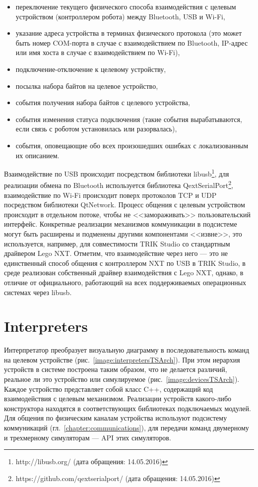 \documentclass[conference]{IEEEtran}
\begin{document}
\begin{itemize}
    \item переключение текущего физического способа взаимодействия с целевым устройством (контроллером робота) между Bluetooth, USB и Wi-Fi,
    \item указание адреса устройства в терминах физического протокола (это может быть номер COM-порта в случае с взаимодействием по Bluetooth, IP-адрес или имя хоста в случае с взаимодействием по Wi-Fi),
    \item подключение-отключение к целевому устройству,
    \item посылка набора байтов на целевое устройство,
    \item события получения набора байтов с целевого устройства,
    \item события изменения статуса подключения (такие события вырабатываются, если связь с роботом установилась или разорвалась),
    \item события, оповещающие обо всех произошедших ошибках с локализованным их описанием.
\end{itemize}

Взаимодействие по USB происходит посредством библиотеки libusb\footnote{http://libusb.org/ (дата обращения: 14.05.2016)}, для реализации обмена по Bluetooth используется библиотека QextSerialPort\footnote{https://github.com/qextserialport/ (дата обращения: 14.05.2016)}, взаимодействие по Wi-Fi происходит поверх протоколов TCP и UDP посредством библиотеки QtNetwork. Процесс общения с целевым устройством происходит в отдельном потоке, чтобы не <<замораживать>> пользовательский интерфейс. Конкретные реализации механизмов коммуникации в подсистеме могут быть расширены и подменены другими компонентами <<извне>>, это используется, например, для совместимости TRIK Studio со стандартным драйвером Lego NXT. Отметим, что взаимодействие через него --- это не единственный способ общения с контроллером NXT по USB в TRIK Studio, в среде реализован собственный драйвер взаимодействия с Lego NXT, однако, в отличие от официального, работающий на всех поддерживаемых операционных системах через libusb.

\section{Interpreters}
\label{chapter:interpreters}

Интерпретатор преобразует визуальную диаграмму в последовательность команд на целевом устройстве (рис.~\ref{image:interpretersTSArch}). При этом иерархия устройств в системе построена таким образом, что не делается различий, реальное ли это устройство или симулируемое (рис.~\ref{image:devicesTSArch}). Каждое устройство представляет собой класс C++, содержащий код взаимодействия с целевым механизмом. Реализации устройств какого-либо конструктора находятся в соответствующих библиотеках подключаемых модулей. Для общения по физическим каналам устройства используют подсистему коммуникаций (гл.~\ref{chapter:communications}), для передачи команд двумерному и трехмерному симуляторам --- API этих симуляторов.
\end{document}
